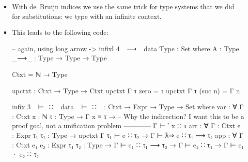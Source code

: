\documentclass{lecturenotes}
\begin{document}
\begin{itemize}
\item With de~Bruijn indices we use the same trick for type systems that we did for substitutions: we type with an infinite context.
\item This leads to the following code:
\begin{code}
-- again, using long arrow \-->
infixl 4 _⟶_
data Type : Set where
  A : Type
  _⟶_ : Type → Type → Type

Ctxt = ℕ → Type

upctxt : Ctxt → Type → Ctxt
upctxt Γ τ zero = τ
upctxt Γ τ (suc n) = Γ n

infix 3 _⊢_∷_
data _⊢_∷_ : Ctxt → Expr → Type → Set where
  var : ∀ {Γ : Ctxt} {x : ℕ} {τ : Type} →
     Γ x ≡ τ →
     -- Why the indirection? I want this to be a proof goal, not a unification problem
     ------------
     Γ ⊢ ‵ x ∷ τ
  arr : ∀ {Γ : Ctxt} {e : Expr} {τ₁ τ₂ : Type} →
    upctxt Γ τ₁ ⊢ e ∷ τ₂ →
    Γ ⊢ ƛ⇒ e ∷ τ₁ ⟶ τ₂
  app : ∀ {Γ : Ctxt} {e₁ e₂ : Expr} {τ₁ τ₂ : Type} →
    Γ ⊢ e₁ ∷ τ₁ ⟶ τ₂ →
    Γ ⊢ e₂ ∷ τ₁ →
    Γ ⊢ e₁ · e₂ ∷ τ₂


\end{code}
\end{itemize}
\end{document}
